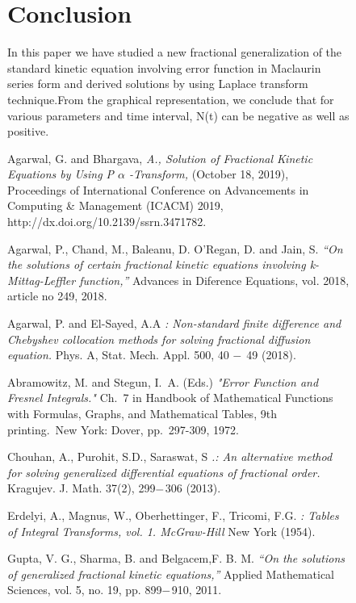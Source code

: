 \documentclass[leqno]{article}
\begin{document}
\begin{figure}[H]
\section{Conclusion}
In this paper we have studied a new fractional generalization of the standard kinetic equation involving error function in Maclaurin series form and derived solutions by using Laplace transform technique.From the graphical representation, we conclude that for various parameters and time interval, N(t) can be negative as well as positive.
\begin{thebibliography}{9}

    Agarwal, G. and Bhargava,
    \textit{A., Solution of Fractional Kinetic Equations by Using P $\alpha$ -Transform,}
    (October 18, 2019), 
    Proceedings of International Conference on Advancements in Computing \& Management (ICACM) 2019,
    http://dx.doi.org/10.2139/ssrn.3471782.

    Agarwal, P., Chand, M., Baleanu, D. O’Regan, D. and Jain, S.
    \textit{“On the solutions of certain fractional kinetic equations involving k-Mittag-Leffler function,”}
    Advances in Diference Equations, vol. 2018, article no 249, 2018.

    Agarwal, P. and El-Sayed, A.A
    \textit{: Non-standard finite difference and Chebyshev collocation methods for solving fractional diffusion equation.}
    Phys. A, Stat. Mech. Appl. 500, 40 $\--$ 49 (2018).
    
    Abramowitz, M. and Stegun, I. A. (Eds.)
    \textit{"Error Function and Fresnel Integrals."}
    Ch. 7 in  Handbook of Mathematical Functions with Formulas, Graphs, and Mathematical Tables, 9th printing. New York: Dover, pp. 297-309, 1972.

    Chouhan, A., Purohit, S.D., Saraswat, S
    \textit{.: An alternative method for solving generalized differential equations of fractional order.}
    Kragujev. J. Math. 37(2), 299$\--$306 (2013).

    Erdelyi, A., Magnus, W., Oberhettinger, F., Tricomi, F.G.
    \textit{: Tables of Integral Transforms, vol. 1. McGraw-Hill}
    New York (1954).

    Gupta, V. G., Sharma, B. and Belgacem,F. B. M.
    \textit{“On the solutions of generalized fractional kinetic equations,”}
    Applied Mathematical Sciences, vol. 5, no. 19, pp. 899$\--$910, 2011.


\end{thebibliography}
\end{figure}
\end{document}
